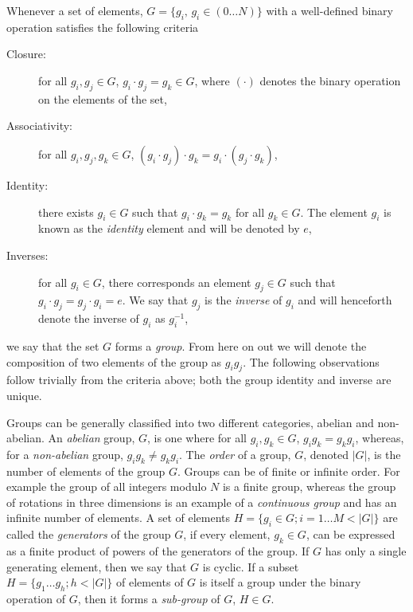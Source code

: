\documentclass{article}
\newcommand\defn[1]{\textsl{#1}}
\begin{document}
Whenever a set of elements, $G=\{g_i,\, g_i\in(0\ldots N)\}$ with a well-defined binary operation satisfies the following criteria 
\begin{description}
\item[Closure:] for all $g_i,g_j\in G$, $g_i\cdot g_j=g_k\in G$, where $(\cdot)$ denotes the binary operation on the elements of the set,
\item[Associativity:] for all $g_i,g_j,g_k\in G$, $(g_i\cdot g_j)\cdot g_k=g_i\cdot(g_j\cdot g_k)$,
\item[Identity:] there exists $g_i\in G$ such that $g_i\cdot g_k=g_k$ for all $g_k\in G$.  The element $g_i$ is known as the \defn{identity} element and will be denoted by $e$,
\item[Inverses:] for all $g_i\in G$, there corresponds an element $g_j\in G$ such that $g_i\cdot g_j=g_j\cdot g_i=e$.  We say that $g_j$ is the \defn{inverse} of $g_i$ and will henceforth denote the inverse of $g_i$ as $g_i^{-1}$,
\end{description}
we say that the set $G$ forms a \defn{group}.  From here on out we will denote the composition of two elements of the group as $g_ig_j$.  The following observations follow trivially from the criteria above;  both the group identity and inverse are unique.

Groups can be generally classified into two different categories, abelian and non-abelian.  An \defn{abelian} group, $G$, is one where for all $g_i, g_k\in G$, $g_ig_k=g_kg_i$, whereas, for a \defn{non-abelian} group, $g_ig_k\neq g_kg_i$.  The \defn{order} of a group, $G$, denoted $\lvert G\rvert$, is the number of elements of the group $G$.  Groups can be of finite or infinite order.  For example the group of all integers modulo $N$ is a finite group, whereas the group of rotations in three dimensions is an example of a \defn{continuous group} and has an infinite number of elements. A set of elements $H=\{g_i\in G; i=1\ldots M< \lvert G\rvert\}$ are called the \defn{generators} of the group $G$, if every element, $g_k\in G$, can be expressed as a finite product of powers of the generators of the group. If $G$ has only a single generating element, then we say that $G$ is cyclic.  If a subset $H=\{g_1\ldots g_h; h<\lvert G\rvert\}$ of elements of $G$ is itself a group under the binary operation of $G$, then it forms a \defn{sub-group} of $G$, $H\in G$.  
\end{document}
